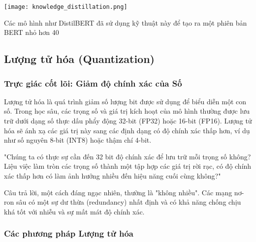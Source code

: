 \begin{center}
    \texttt{[image: knowledge\_distillation.png]}
    \label{fig:knowledge_distillation}
\end{center}

Các mô hình như DistilBERT đã sử dụng kỹ thuật này để tạo ra một phiên bản BERT nhỏ hơn 40%

\subsection{Lượng tử hóa (Quantization)}
\label{ssec:quantization}

\subsubsection{Trực giác cốt lõi: Giảm độ chính xác của Số}
Lượng tử hóa là quá trình giảm số lượng bit được sử dụng để biểu diễn một con số. Trong học sâu, các trọng số và giá trị kích hoạt của mô hình thường được lưu trữ dưới dạng số thực dấu phẩy động 32-bit (FP32) hoặc 16-bit (FP16). Lượng tử hóa sẽ ánh xạ các giá trị này sang các định dạng có độ chính xác thấp hơn, ví dụ như số nguyên 8-bit (INT8) hoặc thậm chí 4-bit.

\begin{tcolorbox}[
    title=Triết lý của Lượng tử hóa,
    colback=blue!5!white, colframe=blue!75!black, fonttitle=\bfseries
]
"Chúng ta có thực sự cần đến 32 bit độ chính xác để lưu trữ mỗi trọng số không? Liệu việc làm tròn các trọng số thành một tập hợp các giá trị rời rạc, có độ chính xác thấp hơn có làm ảnh hưởng nhiều đến hiệu năng cuối cùng không?"
\end{tcolorbox}
Câu trả lời, một cách đáng ngạc nhiên, thường là "không nhiều". Các mạng nơ-ron sâu có một sự dư thừa (redundancy) nhất định và có khả năng chống chịu khá tốt với nhiễu và sự mất mát độ chính xác.

\subsubsection{Các phương pháp Lượng tử hóa}
